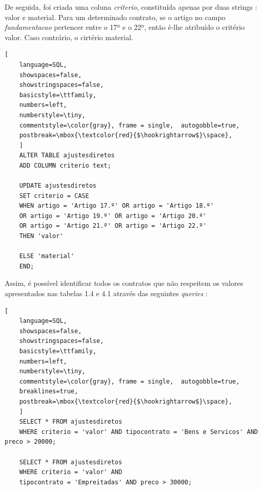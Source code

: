 De seguida, foi criada uma coluna \textit{criterio}, constituída apenas por duas strings : valor e material. Para um determinado contrato, se o artigo no campo \textit{fundamentacao} pertencer entre o 17º e o 22º, então é-lhe atribuído o critério valor. Caso contrário, o cirtério material. 


\begin{lstlisting}[
	language=SQL,
	showspaces=false,
	showstringspaces=false,
	basicstyle=\ttfamily,
	numbers=left,
	numberstyle=\tiny,
	commentstyle=\color{gray}, frame = single,	autogobble=true,
	postbreak=\mbox{\textcolor{red}{$\hookrightarrow$}\space},
	]
	ALTER TABLE ajustesdiretos
	ADD COLUMN criterio text;
	
	UPDATE ajustesdiretos
	SET criterio = CASE
	WHEN artigo = 'Artigo 17.º' OR artigo = 'Artigo 18.º' 
	OR artigo = 'Artigo 19.º' OR artigo = 'Artigo 20.º' 
	OR artigo = 'Artigo 21.º' OR artigo = 'Artigo 22.º' 
	THEN 'valor'
	
	ELSE 'material' 
	END;
\end{lstlisting}


Assim, é possível identificar todos os contratos que não respeitem os valores apresentados nas tabelas 1.4 e 4.1 através das seguintes \textit{queries} : 

\begin{lstlisting}[
	language=SQL,
	showspaces=false,
	showstringspaces=false,
	basicstyle=\ttfamily,
	numbers=left,
	numberstyle=\tiny,
	commentstyle=\color{gray}, frame = single,	autogobble=true,
	breaklines=true,
	postbreak=\mbox{\textcolor{red}{$\hookrightarrow$}\space},
	]
	SELECT * FROM ajustesdiretos
	WHERE criterio = 'valor' AND tipocontrato = 'Bens e Servicos' AND preco > 20000;
	
	SELECT * FROM ajustesdiretos
	WHERE criterio = 'valor' AND 
	tipocontrato = 'Empreitadas' AND preco > 30000;
\end{lstlisting}












